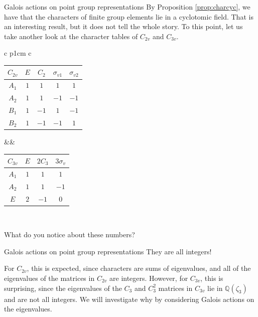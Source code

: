 \documentclass{beamer}
\newcommand{\vs}{\vspace{5mm}}
\begin{document}
    \begin{frame}{Galois actions on point group representations}
        By Proposition \ref{prop:charcyc}, we have that the characters of finite group elements lie in a cyclotomic field. That is an interesting result, but it does not tell the whole story. To this point, let us take another look at the character tables of $C_{2v}$ and $C_{3v}$.

        \begin{table}[htbp]
            \centering
            \renewcommand{\arraystretch}{1.5}
            \begin{tabular}{c p{1cm} c}
                \begin{tabular}{c|cccc}
                    $C_{2v}$ & $E$ & $C_2$ & $\sigma_{v1}$ & $\sigma_{v2}$\\
                    \hline
                    $A_1$ & $1$ & $1$ & $1$ & $1$\\
                    $A_2$ & $1$ & $1$ & $-1$ & $-1$\\
                    $B_1$ & $1$ & $-1$ & $1$ & $-1$\\
                    $B_2$ & $1$ & $-1$ & $-1$ & $1$\\
                \end{tabular}&&
                \begin{tabular}{c|ccc}
                    $C_{3v}$ & $E$ & $2C_3$ & $3\sigma_{v}$\\
                    \hline
                    $A_1$ & $1$ & $1$ & $1$\\
                    $A_2$ & $1$ & $1$ & $-1$\\
                    $E$ & $2$ & $-1$ & $0$\\
                \end{tabular}\\
            \end{tabular}
        \end{table}

        What do you notice about these numbers?
    \end{frame}

    \begin{frame}{Galois actions on point group representations}
        They are all integers!
        \vs
        
        For $C_{2v}$, this is expected, since characters are sums of eigenvalues, and all of the eigenvalues of the matrices in $C_{2v}$ are integers. However, for $C_{3v}$, this is surprising, since the eigenvalues of the $C_3$ and $C_3^2$ matrices in $C_{3v}$ lie in $\mathbb{Q}(\zeta_3)$ and are not all integers. We will investigate why by considering Galois actions on the eigenvalues.
    \end{frame}
    
\end{document}
